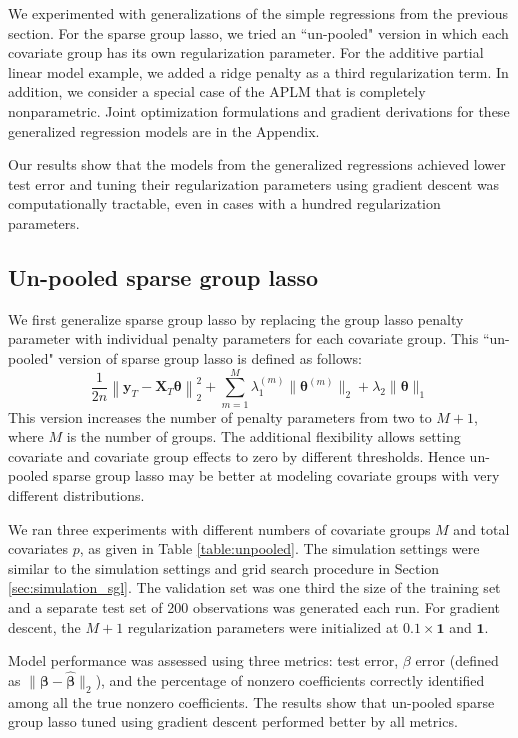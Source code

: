 \documentclass{statsoc}
\begin{document}
We experimented with generalizations of the simple regressions from the previous section. For the sparse group lasso, we tried an ``un-pooled" version in which each covariate group has its own regularization parameter. For the additive partial linear model example, we added a ridge penalty as a third regularization term. In addition, we consider a special case of the APLM that is completely nonparametric. Joint optimization formulations and gradient derivations for these generalized regression models are in the Appendix.

Our results show that the models from the generalized regressions achieved lower test error and tuning their regularization parameters using gradient descent was computationally tractable, even in cases with a hundred regularization parameters.

\subsection{Un-pooled sparse group lasso}

We first generalize sparse group lasso by replacing the group lasso penalty parameter with individual penalty parameters for each covariate group. This ``un-pooled" version of sparse group lasso is defined as follows:
\begin{equation}
\frac{1}{2n} 
\left \| \boldsymbol{y}_T - \boldsymbol{X}_T \boldsymbol{\theta} \right \|^2_2
+ \sum_{m=1}^M \lambda_1^{(m)} \| \boldsymbol \theta^{(m)} \|_2
+ \lambda_2 \| \boldsymbol \theta \|_1
\label{unpooledSGL}
\end{equation}
This version increases the number of penalty parameters from two to $M+1$, where $M$ is the number of groups. The additional flexibility allows setting covariate and covariate group effects to zero by different thresholds. Hence un-pooled sparse group lasso may be better at modeling covariate groups with very different distributions.

We ran three experiments with different numbers of covariate groups $M$ and total covariates $p$, as given in Table \ref{table:unpooled}. The simulation settings were similar to the simulation settings and grid search procedure in Section \ref{sec:simulation_sgl}. The validation set was one third the size of the training set and a separate test set of 200 observations was generated each run. For gradient descent, the $M+1$ regularization parameters were initialized at $0.1 \times \boldsymbol 1$ and $\boldsymbol 1$.

Model performance was assessed using three metrics: test error, $\beta$ error (defined as $\| \boldsymbol \beta - \hat {\boldsymbol \beta} \|_2$), and the percentage of nonzero coefficients correctly identified among all the true nonzero coefficients. The results show that un-pooled sparse group lasso tuned using gradient descent performed better by all metrics.
\end{document}
